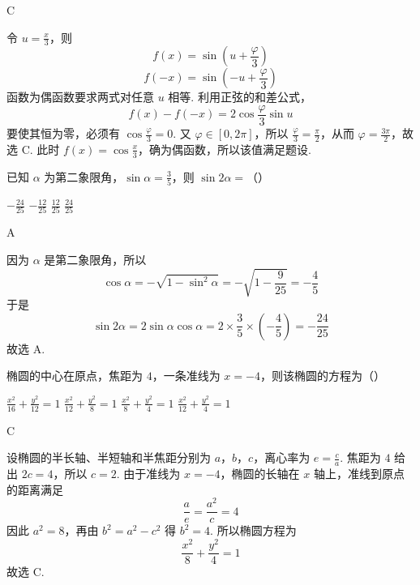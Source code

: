 \begin{answer}
C
\end{answer}

\begin{solution}
令 \(u=\frac{x}{3}\)，则
\[
f(x)=\sin\left(u+\frac{\varphi}{3}\right)
\]
\[
f(-x)=\sin\left(-u+\frac{\varphi}{3}\right)
\]
函数为偶函数要求两式对任意 \(u\) 相等. 利用正弦的和差公式，
\[
f(x)-f(-x)=2\cos\frac{\varphi}{3}\sin u
\]
要使其恒为零，必须有 \(\cos\frac{\varphi}{3}=0\). 又 \(\varphi\in[0,2\pi]\)，所以 \(\frac{\varphi}{3}=\frac{\pi}{2}\)，从而 \(\varphi=\frac{3\pi}{2}\)，故选 C.
此时 \(f(x)=\cos\frac{x}{3}\)，确为偶函数，所以该值满足题设.
\end{solution}

\begin{problem}
已知 \(\alpha\) 为第二象限角，\(\sin \alpha = \frac{3}{5}\)，则 \(\sin 2\alpha =\)（\quad）

\choices
    {\(-\frac{24}{25}\)}
    {\(-\frac{12}{25}\)}
    {\(\frac{12}{25}\)}
    {\(\frac{24}{25}\)}
\end{problem}

\begin{answer}
A
\end{answer}

\begin{solution}
因为 \(\alpha\) 是第二象限角，所以
\[
\cos\alpha=-\sqrt{1-\sin^{2}\alpha}=-\sqrt{1-\frac{9}{25}}=-\frac45
\]
于是
\[
\sin2\alpha=2\sin\alpha\cos\alpha
=2\times\frac35\times\left(-\frac45\right)=-\frac{24}{25}
\]
故选 A.
\end{solution}

\begin{problem}
椭圆的中心在原点，焦距为 \(4\)，一条准线为 \(x = -4\)，则该椭圆的方程为（\quad）

\choices
    {\(\frac{x^2}{16} +\frac{y^2}{12} = 1\)}
    {\(\frac{x^2}{12} +\frac{y^2}{8} = 1\)}
    {\(\frac{x^2}{8} +\frac{y^2}{4} = 1\)}
    {\(\frac{x^2}{12} +\frac{y^2}{4} = 1\)}
\end{problem}

\begin{answer}
C
\end{answer}

\begin{solution}
设椭圆的半长轴、半短轴和半焦距分别为 \(a\)，\(b\)，\(c\)，离心率为 \(e=\frac{c}{a}\). 焦距为 \(4\) 给出 \(2c=4\)，所以 \(c=2\). 由于准线为 \(x=-4\)，椭圆的长轴在 \(x\) 轴上，准线到原点的距离满足
\[
\frac{a}{e}=\frac{a^{2}}{c}=4
\]
因此 \(a^{2}=8\)，再由 \(b^{2}=a^{2}-c^{2}\) 得 \(b^{2}=4\). 所以椭圆方程为
\[
\frac{x^{2}}8+\frac{y^{2}}4=1
\]
故选 C.
\end{solution}

